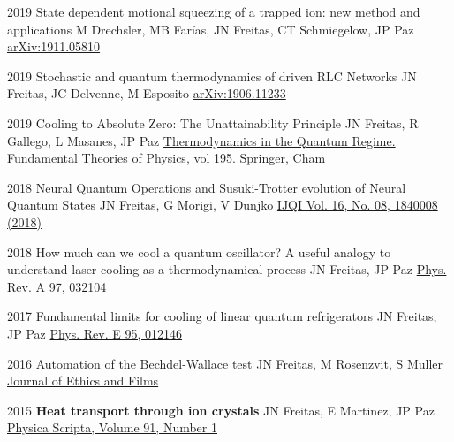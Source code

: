 

\begin{cvpubs}

\cvpub
    {2019}
    {State dependent motional squeezing of a trapped ion: new method and applications}
    {M Drechsler, MB Farías, JN Freitas, CT Schmiegelow, JP Paz}
    {\href{https://arxiv.org/abs/1911.05810}{arXiv:1911.05810}}

\cvpub
    {2019}
    {Stochastic and quantum thermodynamics of driven RLC Networks}
    {JN Freitas, JC Delvenne, M Esposito}
    {\href{https://arxiv.org/abs/1906.11233}{arXiv:1906.11233}}

\cvpub
    {2019}
    {Cooling to Absolute Zero: The Unattainability Principle}
    {JN Freitas, R Gallego, L Masanes,  JP Paz}
    {\href{https://link.springer.com/chapter/10.1007/978-3-319-99046-0_25}{Thermodynamics in the Quantum Regime. Fundamental Theories of Physics, vol 195. Springer, Cham}}

\cvpub
    {2018}
    {Neural Quantum Operations and Susuki-Trotter evolution of Neural Quantum States}
    {JN Freitas, G Morigi, V Dunjko}
    {\href{https://www.worldscientific.com/doi/abs/10.1142/S0219749918400087}{IJQI Vol. 16, No. 08, 1840008 (2018)}}

\cvpub
    {2018}
    {How much can we cool a quantum oscillator? A useful analogy to understand laser cooling as a thermodynamical process}
    {JN Freitas, JP Paz}
    {\href{https://journals.aps.org/pra/abstract/10.1103/PhysRevA.97.032104}{Phys. Rev. A 97, 032104}}

\cvpub
    {2017}
    {Fundamental limits for cooling of linear quantum refrigerators}
    {JN Freitas, JP Paz}
    {\href{http://journals.aps.org/pre/abstract/10.1103/PhysRevE.95.012146}{Phys. Rev. E 95, 012146}}

\cvpub
    {2016}
    {Automation of the Bechdel-Wallace test}
    {JN Freitas, M Rosenzvit, S Muller}
    {\href{http://www.journal.eticaycine.org/Automation-of-the-Bechdel-Wallace}{Journal of Ethics and Films}}

\cvpub
    {2015}
    {\bf Heat transport through ion crystals}
    {JN Freitas, E Martinez, JP Paz}
    {\href{http://iopscience.iop.org/article/10.1088/0031-8949/91/1/013007/meta}{Physica Scripta, Volume 91, Number 1}}


\end{cvpubs}
